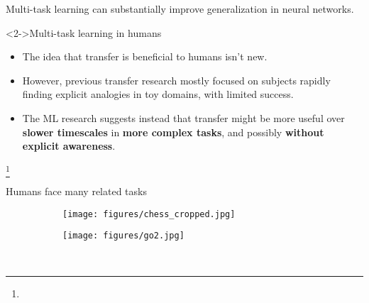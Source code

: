 \documentclass{beamer}
\newcommand\blfootnote[1]{%
  \begingroup
  \renewcommand\thefootnote{}\footnote{#1}%
  \addtocounter{footnote}{-1}%
  \endgroup
}
\begin{document}
\begin{frame}[standout]
Multi-task learning can substantially improve generalization in neural networks.\par
\end{frame}


\begin{frame}<2->{Multi-task learning in humans}
\begin{itemize}
\item The idea that transfer is beneficial to humans isn't new.
\item<3-> However, previous transfer research mostly focused on subjects rapidly finding explicit analogies in toy domains, with limited success.
\item<4-> The ML research suggests instead that transfer might be more useful over \textbf{slower timescales} in \textbf{more complex tasks}, and possibly \textbf{without explicit awareness}.
\end{itemize}
\vspace{2em}
\blfootnote{
    \only<1,4->{\citep{Lampinen2017a, Bransford1999}}
}

\end{frame}

\begin{frame}{Humans face many related tasks}
\begin{figure}
\centering
\begin{subfigure}{0.4\textwidth}
\texttt{[image: figures/chess\_cropped.jpg]}
\end{subfigure}%
\begin{subfigure}{0.4\textwidth}
\texttt{[image: figures/go2.jpg]}
\end{subfigure}\\
\end{figure}
\end{frame}
\end{document}
